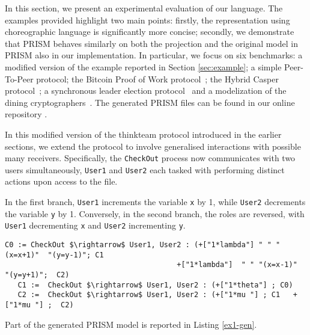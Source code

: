 In this section, we present an experimental evaluation of our
  language.  The examples provided highlight two main points: firstly,
  the representation using choreographic language is significantly
  more concise; secondly, we demonstrate that PRISM behaves similarly
  on both the projection and the original model in PRISM also in our
  implementation.
In particular, we focus on six benchmarks: a modified version of the
example reported in Section \ref{sec:example}; a simple Peer-To-Peer protocol;  the Bitcoin Proof of Work
protocol~\cite{DBLP:journals/concurrency/BistarelliNGLMV23}; the
Hybrid Casper
protocol~\cite{DBLP:journals/distribledger/GallettaLMV23}; a synchronous leader election protocol~\cite{IR90} and a modelization of the dining cryptographers~\cite{Cha88}.  The
generated PRISM files can be found in our online repository
\cite{repository}.


In this modified version of the thinkteam protocol introduced in the earlier sections, we extend the protocol to involve generalised interactions with possible many receivers. Specifically, the \texttt{CheckOut} process now communicates with two users simultaneously, \texttt{User1} and \texttt{User2} each tasked with performing distinct actions upon access to the file. 

 In the first branch, \texttt{User1} increments the variable \texttt{x} by 1, while \texttt{User2} decrements the variable \texttt{y} by 1. Conversely, in the second branch, the roles are reversed, with \texttt{User1} decrementing \texttt{x} and \texttt{User2} incrementing \texttt{y}.

 \begin{lstlisting}[style=chor-color,breaklines=true, postbreak=\mbox{\textcolor{red}{$\hookrightarrow$}\space},caption={Choreography for the Modified thinkteam Protocol},captionpos=b,label={ex1-chor}]
   C0 := CheckOut $\rightarrow$ User1, User2 : (+["1*lambda"] " " "(x=x+1)"  "(y=y-1)"; C1
                                       	+["1*lambda"]  " " "(x=x-1)"  "(y=y+1)";  C2)
   C1 :=  CheckOut $\rightarrow$ User1, User2 : (+["1*theta"] ; C0)  
   C2 :=  CheckOut $\rightarrow$ User1, User2 : (+["1*mu "] ; C1   +["1*mu "] ;  C2)
 \end{lstlisting}

 Part of the generated PRISM model is reported in Listing \ref{ex1-gen}. 

